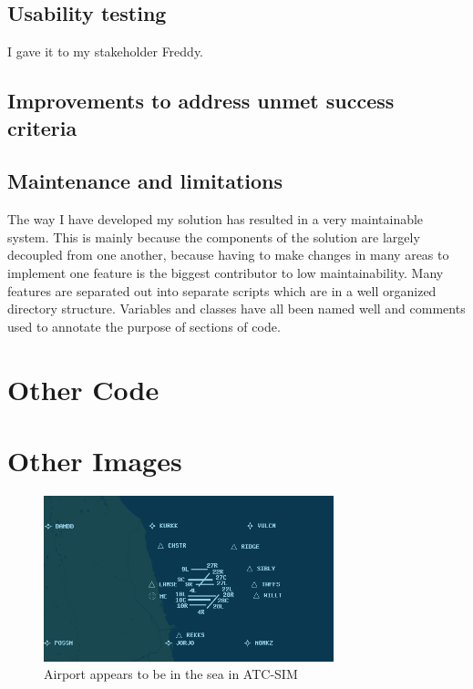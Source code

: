 \documentclass{article}
\begin{document}
\subsection{Usability testing}
I gave it to my stakeholder Freddy.


\subsection{Improvements to address unmet success criteria}


\subsection{Maintenance and limitations}
The way I have developed my solution has resulted in a very maintainable system.
This is mainly because the components of the solution are largely decoupled from one another, because having to make changes in many areas to implement one feature is the biggest contributor to low maintainability.
Many features are separated out into separate scripts which are in a well organized directory structure.
Variables and classes have all been named well and comments used to annotate the purpose of sections of code.

\clearpage

\printbibliography
{}

\printnoidxglossaries

\begin{appendices}
\section{Other Code}\label{appendix:otherfunctions}


\section{Other Images}\label{appendix:otherimages}
\begin{figure}[H]
\centering
\includegraphics[width=0.75\textwidth]{existing_solutions/airportinseaatcsim.png}
\caption{\label{fig:airportinseaatcsim}Airport appears to be in the sea in ATC-SIM}
\end{figure}
\end{appendices}
\end{document}
